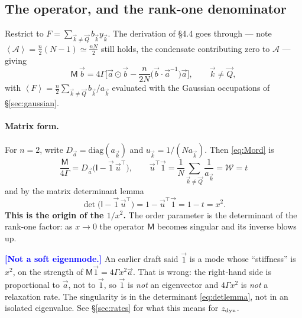 \documentclass[11pt,a4paper]{article}
\newcommand{\bk}{\vec k}
\newcommand{\bQ}{\vec Q}
\newcommand{\avg}[1]{\left\langle #1 \right\rangle}
\newcommand{\Wc}{\mathcal{W}}
\newcommand{\FLAG}[1]{\textcolor{blue}{\textbf{[#1]}}}
\newcommand{\Ac}{\mathcal{A}}
\newcommand{\Mc}{\mathsf{M}}
\newcommand{\bk}{\vec k}
\newcommand{\bQ}{\vec Q}
\newcommand{\avg}[1]{\left\langle #1 \right\rangle}
\newcommand{\Wc}{\mathcal{W}}
\newcommand{\FLAG}[1]{\textcolor{blue}{\textbf{[#1]}}}
\begin{document}
\subsection{The operator, and the rank-one denominator}
\label{sec:lift}
Restrict to $F=\sum_{\bk\neq\bQ}b_{\bk}y_{\bk}$. The derivation of \S4.4 goes through ---
note $\avg{\Ac}=\tfrac n2(N-1)\simeq\tfrac{nN}{2}$ still holds, the condensate contributing
zero to $\Ac$ --- giving
\begin{equation}
  \Mc\,\vec b=4\Gamma\Big[\vec a\odot\vec b-\frac{n}{2N}\big(\vec b\cdot\vec a^{-1}\big)\vec a\Big],
  \qquad \bk\neq\bQ ,
  \label{eq:Mord}
\end{equation}
with $\avg{F}=\tfrac n2\sum_{\bk\neq\bQ}b_{\bk}/a_{\bk}$ evaluated with the Gaussian
occupations of \S\ref{sec:gaussian}.

\paragraph{Matrix form.} For $n=2$, write $D_{\vec a}=\mathrm{diag}(a_{\bk})$ and
$u_{\bk}=1/(Na_{\bk})$. Then \eqref{eq:Mord} is
\begin{equation}
  \boxed{\ \frac{\Mc}{4\Gamma}=D_{\vec a}\big(\mathsf I-\vec1\,\vec u^{\top}\big),
  \qquad \vec u^{\top}\vec1=\frac1N\sum_{\bk\neq\bQ}\frac{1}{a_{\bk}}=\Wc=t\ }
  \label{eq:rankone}
\end{equation}
and by the matrix determinant lemma
\begin{equation}
  \det\big(\mathsf I-\vec1\,\vec u^{\top}\big)=1-\vec u^\top\vec1=1-t=x^{2} .
  \label{eq:detlemma}
\end{equation}
\textbf{This is the origin of the $1/x^2$.} The order parameter is the determinant of the
rank-one factor: as $x\to0$ the operator $\Mc$ becomes singular and its inverse blows up.

\FLAG{Not a soft eigenmode.} An earlier draft said $\vec1$ is a mode whose ``stiffness'' is
$x^2$, on the strength of $\Mc\vec1=4\Gamma x^2\vec a$. That is wrong: the right-hand side
is proportional to $\vec a$, not to $\vec1$, so $\vec1$ is \emph{not} an eigenvector and
$4\Gamma x^2$ is \emph{not} a relaxation rate. The singularity is in the determinant
\eqref{eq:detlemma}, not in an isolated eigenvalue. See \S\ref{sec:rates} for what this
means for $z_{\rm dyn}$.
\end{document}
